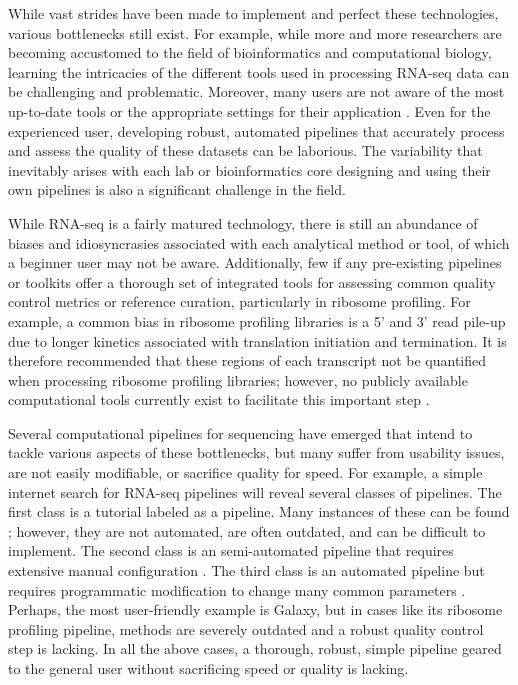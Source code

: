 \documentclass[11pt, a4paper, oneside]{article}
\begin{document}
While vast strides have been made to implement and perfect these technologies, various bottlenecks still exist. For example, while more and more researchers are becoming accustomed to  the field of bioinformatics and computational biology, learning the intricacies of the different tools used in processing RNA-seq data can be challenging and problematic. Moreover, many users are not aware of the most up-to-date tools or the appropriate settings for their application \cite{costello_npjsba, funari_science}. Even for the experienced user, developing robust, automated pipelines that accurately process and assess the quality of these datasets can be laborious. The variability that inevitably arises with each lab or bioinformatics core designing and using their own pipelines is also a significant challenge in the field. \par

While RNA-seq is a fairly matured technology, there is still an abundance of biases and idiosyncrasies associated with each analytical method or tool, of which a beginner user may not be aware. Additionally, few if any pre-existing pipelines or toolkits offer a thorough set of integrated tools for assessing common quality control metrics or reference curation, particularly in ribosome profiling. For example, a common bias in ribosome profiling libraries is a 5' and 3' read pile-up \cite{gerashchenko_nar, artieri_gr, hussman_plosg} due to longer kinetics associated with translation initiation and termination. It is therefore recommended that these regions of each transcript not be quantified when processing ribosome profiling libraries; however, no publicly available computational tools currently exist to facilitate this important step \cite{ingolia_meth, weinberg_reports}. \par

Several computational pipelines for sequencing have emerged that intend to tackle various aspects of these bottlenecks, but many suffer from usability issues, are not easily modifiable, or sacrifice quality for speed. For example, a simple internet search for RNA-seq pipelines will reveal several classes of pipelines. The first class is a tutorial labeled as a pipeline. Many instances of these can be found \cite{encode_pipeline, gdc_pipeline}; however, they are not automated, are often outdated, and can be difficult to implement. The second class is an semi-automated pipeline that requires extensive manual configuration \cite{pavlidis_pipeline, nfcore_pipeline, umcu_pipeline, cellgeni_pipeline}. The third class is an automated pipeline but requires programmatic modification to change many common parameters \cite{dnanexus_pipeline, nextflow_pipeline}. Perhaps, the most user-friendly example is Galaxy, but in cases like its ribosome profiling pipeline, methods are severely outdated and a robust quality control step is lacking. In all the above cases, a thorough, robust, simple pipeline geared to the general user without sacrificing speed or quality is lacking. \par
\end{document}
